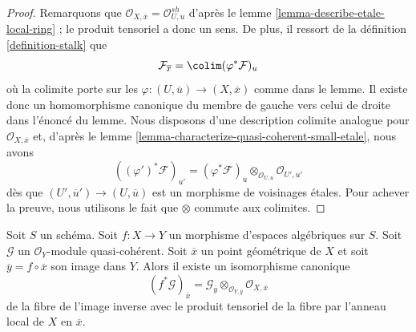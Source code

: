 \begin{proof}
Remarquons que $\mathcal{O}_{X, \overline{x}} = \mathcal{O}_{U, u}^{sh}$ d'après le
lemme \ref{lemma-describe-etale-local-ring} ;
le produit tensoriel a donc un sens. De plus, il ressort de la
définition \ref{definition-stalk}
que
$$
\mathcal{F}_{\overline{x}} = \colim (\varphi^*\mathcal{F})_u
$$
où la colimite porte sur les $\varphi : (U, \overline{u}) \to (X, \overline{x})$
comme dans le lemme. Il existe donc un homomorphisme canonique du membre de gauche vers celui de droite dans
l'énoncé du lemme. Nous disposons d'une description colimite analogue pour
$\mathcal{O}_{X, \overline{x}}$
et, d'après le
lemme \ref{lemma-characterize-quasi-coherent-small-etale},
nous avons
$$
((\varphi')^*\mathcal{F})_{u'} =
(\varphi^*\mathcal{F})_u \otimes_{\mathcal{O}_{U, u}} \mathcal{O}_{U', u'}
$$
dès que $(U', \overline{u}') \to (U, \overline{u})$ est un morphisme de
voisinages \'etales. Pour achever la preuve, nous utilisons le fait que
$\otimes$ commute aux colimites.
\end{proof}

\begin{lemma}
\label{lemma-stalk-pullback-quasi-coherent}
Soit $S$ un schéma. Soit $f : X \to Y$ un morphisme d'espaces algébriques
sur $S$. Soit $\mathcal{G}$ un $\mathcal{O}_Y$-module quasi-cohérent.
Soit $\overline{x}$ un point géométrique de $X$ et soit
$\overline{y} = f \circ \overline{x}$ son image dans $Y$.
Alors il existe un isomorphisme canonique
$$
(f^*\mathcal{G})_{\overline{x}} =
\mathcal{G}_{\overline{y}} \otimes_{\mathcal{O}_{Y, \overline{y}}}
\mathcal{O}_{X, \overline{x}}
$$
de la fibre de l'image inverse avec le produit tensoriel de la fibre
par l'anneau local de $X$ en $\overline{x}$.
\end{lemma}

